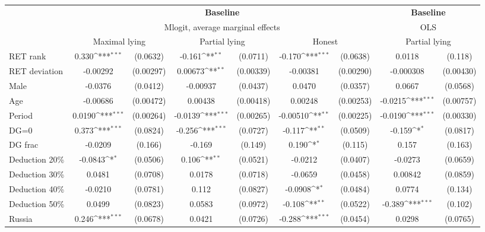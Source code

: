 \def\sym#1{\ifmmode^{#1}\else\(^{#1}\)\fi}
\begin{tabular}{l|cccccc|cc}
\hline\hline
&\multicolumn{6}{c|}{\bf Baseline}&\multicolumn{2}{c}{\bf Baseline}\\ &\multicolumn{6}{c|}{Mlogit, average marginal effects }&\multicolumn{2}{c}{OLS}\\
                &\multicolumn{2}{c}{Maximal lying}&\multicolumn{2}{c}{Partial lying}&\multicolumn{2}{c|}{Honest}  &\multicolumn{2}{c}{Partial lying}\\
\hline
RET rank        &    0.330\sym{***}& (0.0632)&   -0.161\sym{**} & (0.0711)&   -0.170\sym{***}& (0.0638)&   0.0118         &  (0.118)\\
RET deviation   & -0.00292         &(0.00297)&  0.00673\sym{**} &(0.00339)& -0.00381         &(0.00290)&-0.000308         &(0.00430)\\
Male            &  -0.0376         & (0.0412)& -0.00937         & (0.0437)&   0.0470         & (0.0357)&   0.0667         & (0.0568)\\
Age             & -0.00686         &(0.00472)&  0.00438         &(0.00418)&  0.00248         &(0.00253)&  -0.0215\sym{***}&(0.00757)\\
Period          &   0.0190\sym{***}&(0.00264)&  -0.0139\sym{***}&(0.00265)& -0.00510\sym{**} &(0.00225)&  -0.0190\sym{***}&(0.00330)\\
DG=0          &    0.373\sym{***}& (0.0824)&   -0.256\sym{***}& (0.0727)&   -0.117\sym{**} & (0.0509)&   -0.159\sym{*}  & (0.0817)\\
DG frac         &  -0.0209         &  (0.166)&   -0.169         &  (0.149)&    0.190\sym{*}  &  (0.115)&    0.157         &  (0.163)\\
Deduction 20\%&  -0.0843\sym{*}  & (0.0506)&    0.106\sym{**} & (0.0521)&  -0.0212         & (0.0407)&  -0.0273         & (0.0659)\\
Deduction 30\%&   0.0481         & (0.0708)&   0.0178         & (0.0718)&  -0.0659         & (0.0458)&  0.00842         & (0.0859)\\
Deduction 40\%&  -0.0210         & (0.0781)&    0.112         & (0.0827)&  -0.0908\sym{*}  & (0.0484)&   0.0774         &  (0.134)\\
Deduction 50\%&   0.0499         & (0.0823)&   0.0583         & (0.0972)&   -0.108\sym{**} & (0.0522)&   -0.389\sym{***}&  (0.102)\\
Russia        &    0.246\sym{***}& (0.0678)&   0.0421         & (0.0726)&   -0.288\sym{***}& (0.0454)&   0.0298         & (0.0765)\\

\end{tabular}
